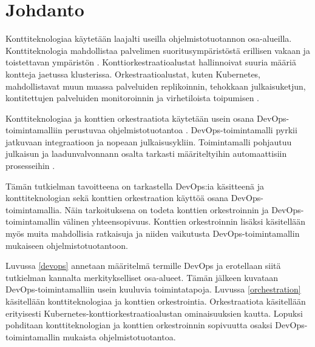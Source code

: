 \chapter{Johdanto\label{intro}}

Konttiteknologiaa käytetään laajalti useilla ohjelmistotuotannon osa-alueilla.
Konttiteknologia mahdollistaa palvelimen suoritusympäristöstä erillisen vakaan ja toistettavan ympäristön \cite{Watada19}.
Konttiorkestraatioalustat hallinnoivat suuria määriä kontteja jaetussa klusterissa.
Orkestraatioalustat, kuten Kubernetes, mahdollistavat muun muassa palveluiden replikoinnin, tehokkaan julkaisuketjun, kontitettujen palveluiden monitoroinnin ja virhetiloista toipumisen \cite{Khan17}.

Konttiteknologiaa ja konttien orkestraatiota käytetään usein osana DevOps-toimintamalliin perustuvaa ohjelmistotuotantoa \cite{Kang16, Narasimhulu23}.
DevOps-toimintamalli pyrkii jatkuvaan integraatioon ja nopeaan julkaisusykliin.
Toimintamalli pohjautuu julkaisun ja laadunvalvonnann osalta tarkasti määriteltyihin automaattisiin prosesseihin \cite{Jabbari16}.

Tämän tutkielman tavoitteena on tarkastella DevOps:ia käsitteenä ja konttiteknologian sekä konttien orkestraation käyttöä osana DevOps-toimintamallia.
Näin tarkoituksena on todeta konttien orkestroinnin ja DevOps-toimintamallin välinen yhteensopivuus.
Konttien orkestroinnin lisäksi käsitellään myös muita mahdollisia ratkaisuja ja niiden vaikutusta DevOps-toimintamallin mukaiseen ohjelmistotuotantoon.

Luvussa \ref{devops} annetaan määritelmä termille DevOps ja erotellaan siitä tutkielman kannalta merkitykselliset osa-alueet.
Tämän jälkeen kuvataan DevOps-toimintamalliin usein kuuluvia toimintatapoja.
Luvussa \ref{orchestration} käsitellään konttiteknologiaa ja konttien orkestrointia.
Orkestraatiota käsitellään erityisesti Kubernetes-konttiorkestraatioalustan ominaisuuksien kautta.
Lopuksi pohditaan konttiteknologian ja konttien orkestroinnin sopivuutta osaksi DevOps-toimintamallin mukaista ohjelmistotuotantoa.
